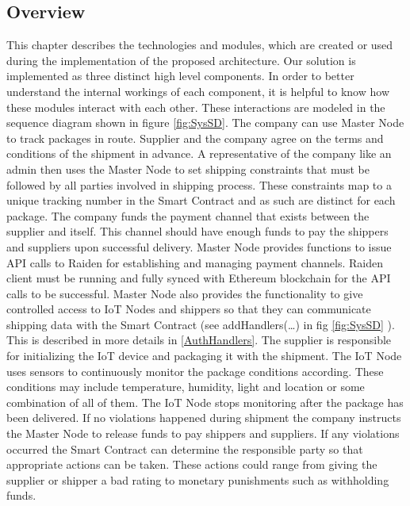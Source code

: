 \subsection{Overview}
This chapter describes the technologies and modules, which are created or used during the implementation of the proposed architecture. Our solution is implemented as three distinct high level components. In order to better understand the internal workings of each component, it is helpful to know how these modules interact with each other.  These interactions are modeled in the sequence diagram shown in figure \ref{fig:SysSD}.  The company can use Master Node to track packages in route. Supplier and the company agree on the terms and conditions of the shipment in advance. A representative of the company like an admin then uses the Master Node to set shipping constraints that must be followed by all parties involved in shipping process. These constraints map to a unique tracking number in the Smart Contract and as such are distinct for each package.  The company funds the payment channel that exists between the supplier and itself. This channel should have enough funds to pay the shippers and suppliers upon successful delivery. Master Node provides functions to issue API calls to Raiden for establishing and managing payment channels. Raiden client must be running and fully synced with Ethereum blockchain for the API calls to be successful. Master Node also provides the functionality to give controlled access to IoT Nodes and shippers so that they can communicate shipping data with the Smart Contract (see addHandlers(…) in fig \ref{fig:SysSD} ). This is described in more details in \ref{AuthHandlers}. The supplier is responsible for initializing the IoT device and packaging it with the shipment. The IoT Node uses sensors to continuously monitor the package conditions according. These conditions may include temperature, humidity, light and location or some combination of all of them. The IoT Node stops monitoring after the package has been delivered. If no violations happened during shipment the company instructs the Master Node to release funds to pay shippers and suppliers. If any violations occurred the Smart Contract can determine the responsible party so that appropriate actions can be taken. These actions could range from giving the supplier or shipper a bad rating to monetary punishments such as withholding funds.

